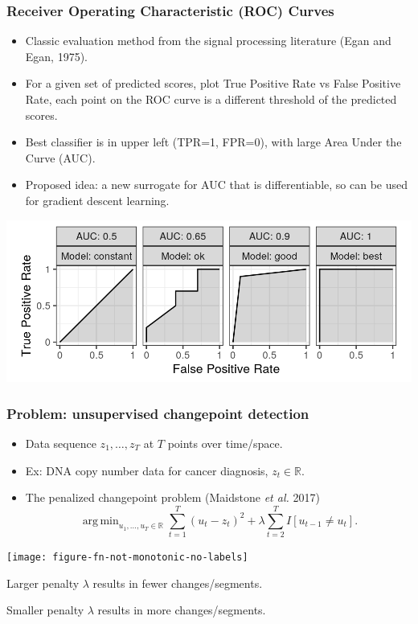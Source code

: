 \documentclass[t]{beamer}
\DeclareMathOperator*{\argmin}{arg\,min}
\begin{document}
\begin{frame}
  \frametitle{Receiver Operating Characteristic (ROC) Curves}
  \begin{itemize}
  \item Classic evaluation method from the signal processing
    literature (Egan and Egan, 1975).
  \item For a given set of predicted scores, plot True Positive Rate
    vs False Positive Rate, each point on the ROC curve is a different
    threshold of the predicted scores.
  \item Best classifier is in upper left (TPR=1, FPR=0), with large
    Area Under the Curve (AUC).
  \item Proposed idea: a new surrogate for AUC that is differentiable,
    so can be used for gradient descent learning.
  \end{itemize}
  \includegraphics[width=\textwidth]{figure-more-than-one-binary}
\end{frame}

\begin{frame}
  \frametitle{Problem: unsupervised changepoint detection}
  \begin{itemize}
  \item Data sequence $z_1,\dots,z_T$ at $T$ points over time/space.
  \item Ex: DNA copy number data for cancer diagnosis, $z_t\in\mathbb R$.
  \item The penalized changepoint problem (Maidstone \emph{et al.} 2017)
$$\argmin_{u_1,\dots,u_T\in\mathbb R} \sum_{t=1}^T (u_t - z_t)^2 + \lambda\sum_{t=2}^T I[u_{t-1} \neq u_t].$$
  \end{itemize}

  \parbox{0.6\textwidth}{
\texttt{[image: figure-fn-not-monotonic-no-labels]}
}
\parbox{0.3\textwidth}{
  Larger penalty $\lambda$ results in fewer changes/segments.

  \vskip 0.5in

  Smaller penalty $\lambda$ results in more changes/segments.
}

\end{frame}
\end{document}
